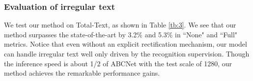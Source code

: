 \documentclass[letterpaper]{article} \usepackage{aaai21}  \usepackage{times}  \usepackage{helvet} \usepackage{courier}  \usepackage[hyphens]{url}  \usepackage{graphicx} \urlstyle{rm} \def\UrlFont{\rm}  \usepackage{natbib}  \usepackage{caption} \frenchspacing  \setlength{\pdfpagewidth}{8.5in}  \setlength{\pdfpageheight}{11in}  \usepackage{multirow}
\begin{document}
\begin{table}[ht]
\begin{center}
\end{center}
\caption{Results under different detection supervision types. `Strong' means the original annotations, and `Weak' means rectangular bounding box annotations.}
\label{tb2}
\end{table}
\begin{table*}[h!]
\begin{center}
\end{center}
\caption{End-to-End recognition precision results on CCPD.}
\label{ccpd}
\end{table*}
\subsubsection{Evaluation of irregular text}
We test our method on Total-Text, as shown in Table \ref{tb:3}.
We see that our method surpasses the state-of-the-art by 3.2\% and 5.3\% in ``None" and ``Full" metrics.
Notice that even without an explicit rectification mechanism, our model can handle irregular text well only driven by the recognition supervision.
Though the inference speed is about 1/2 of ABCNet with the test scale of 1280, our method achieves the remarkable performance gains.
\end{document}
